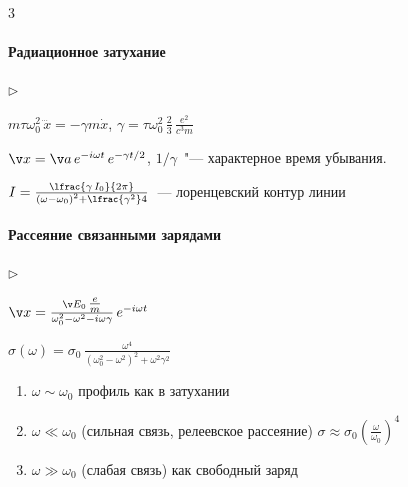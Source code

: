 \documentclass{trchesh}
\newenvironment{facts}{\begin{list}{$\triangleright$}{}}{\end{list}}
\begin{document}
\begin{multicols*}{3}
\paragraph{Радиационное затухание}
\begin{facts}
\item $m \tau \omega_0^2 \, \dddot{x} = - \gamma m \dot x$, $\gamma = \tau \omega_0^2 \,\frac{2}{3}\, \frac{e^2}{c^3m}$
\item $\v x = \v a \, e^{-i \omega t}\, e^{-\gamma t/2}$, $1/\gamma$~"--- характерное время убывания. 
\item $I = \frac{\lfrac{\gamma\, I_0}{2\pi}}{{(\omega - \omega_0)}^2 + \lfrac{\gamma^2} 4}$~--- лоренцевский контур линии
\end{facts}
\noindent
{}

\paragraph{Рассеяние связанными зарядами}

\begin{facts}
\item $\v x= \frac{\v E_0 \, \tfrac e m}{\omega_0^2 - \omega^2 - i \omega \gamma}\, e^{-i \omega t}$
\item $\sigma (\omega) = \sigma_0 \, \frac{\omega ^4}{(\omega_0^2 - \omega^2)^2 + \omega^2 \gamma^2} $
\end{facts}

\begin{enumerate}
  \item $\omega \sim \omega_0$ профиль как в затухании
  \item $\omega \ll \omega_0$ (сильная связь, релеевское рассеяние) $\sigma \approx \sigma_0 \left(\frac \omega {\omega_0}\right)^4$
  \item $\omega \gg \omega_0$ (слабая связь) как свободный заряд
\end{enumerate}
\end{multicols*}
\end{document}
